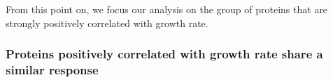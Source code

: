 From this point on, we focus our analysis on the group of proteins that are strongly positively correlated with growth rate.
\subsubsection{Proteins positively correlated with growth rate share a similar response}
\label{propchange} 